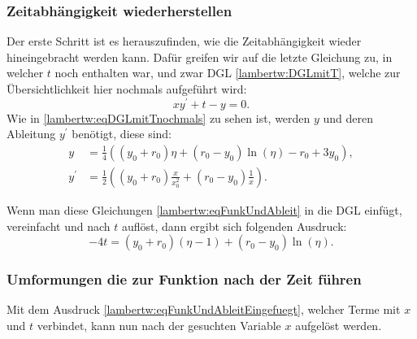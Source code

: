 \subsubsection{Zeitabhängigkeit wiederherstellen
	\label{lambertw:subsubsection:ZeitabhWiederherst}}
Der erste Schritt ist es herauszufinden, wie die Zeitabhängigkeit wieder hineingebracht werden kann. Dafür greifen wir auf die letzte Gleichung zu, in welcher \(t\) noch enthalten war, und zwar DGL \eqref{lambertw:DGLmitT}, welche zur Übersichtlichkeit hier nochmals aufgeführt wird:
\begin{equation}
	x y^{\prime} + t - y
	= 0.
	\label{lambertw:eqDGLmitTnochmals}
\end{equation}
Wie in \eqref{lambertw:eqDGLmitTnochmals} zu sehen ist, werden \(y\) und deren Ableitung \(y^{\prime}\) benötigt, diese sind:
\begin{subequations}
	\begin{align}
		y
		&=
		\frac{1}{4}\left(\left(y_0+r_0\right)\eta+\left(r_0-y_0\right)\operatorname{ln}\left(\eta\right)-r_0+3y_0\right), \\
		\label{lambertw:eqFunkUndAbleit1}
		y^\prime
		&=
		\frac{1}{2}\left(\left(y_0+r_0\right)\frac{x}{x_0^2}+\left(r_0-y_0\right)\frac{1}{x}\right).
	\end{align}
	\label{lambertw:eqFunkUndAbleit}
\end{subequations}

Wenn man diese Gleichungen \ref{lambertw:eqFunkUndAbleit} in die DGL \label{lambertw:eqDGLmitTnochmals} einfügt, vereinfacht und nach \(t\) auflöst, dann ergibt sich folgenden Ausdruck:
\begin{equation}
	-4t
	=
	\left(y_0+r_0\right)\left(\eta-1\right)+\left(r_0-y_0\right)\operatorname{ln}\left(\eta\right).
	\label{lambertw:eqFunkUndAbleitEingefuegt}
\end{equation}

\subsubsection{Umformungen die zur Funktion nach der Zeit führen
	\label{lambertw:subsubsection:UmformBisZumZiel}}
Mit dem Ausdruck \eqref{lambertw:eqFunkUndAbleitEingefuegt}, welcher Terme mit \(x\) und \(t\) verbindet, kann nun nach der gesuchten Variable \(x\) aufgelöst werden. 


